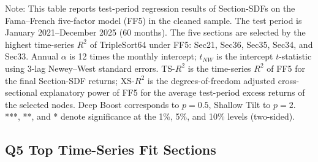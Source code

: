 \documentclass[12pt]{article}
\def\mathrm#1{#1}%
\def\textit#1{#1}%
\begin{document}
\begin{table}[!htbp]
\begin{threeparttable}
    \begin{tablenotes}[flushleft]
      \footnotesize
      \item \textit{Note:} This table reports test-period regression results of Section-SDFs on the Fama--French five-factor model (FF5) in the cleaned sample. The test period is January 2021–December 2025 (60 months). The five sections are selected by the highest time-series $R^2$ of TripleSort64 under FF5: Sec21, Sec36, Sec35, Sec34, and Sec33. Annual $\alpha$ is 12 times the monthly intercept; $t_{\mathrm{NW}}$ is the intercept $t$-statistic using 3-lag Newey--West standard errors. TS-$R^2$ is the time-series $R^2$ of FF5 for the final Section-SDF returns; XS-$R^2$ is the degrees-of-freedom adjusted cross-sectional explanatory power of FF5 for the average test-period excess returns of the selected nodes. Deep Boost corresponds to $p=0.5$, Shallow Tilt to $p=2$. ***, **, and * denote significance at the 1\%, 5\%, and 10\% levels (two-sided).
    \end{tablenotes}
  \end{threeparttable}
\end{table}

\clearpage
\subsection{Q5 Top Time-Series Fit Sections}
\label{app:q5_top_r2}
\end{document}
